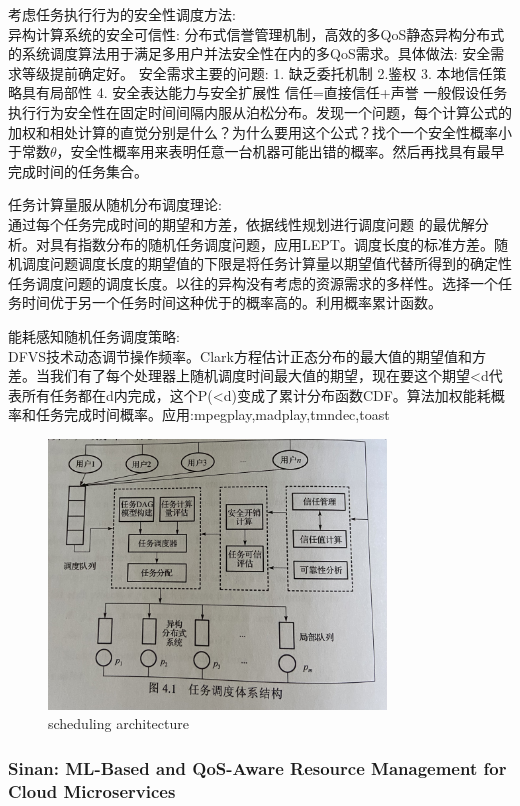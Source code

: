\documentclass[UTF8]{article}
\begin{document}
考虑任务执行行为的安全性调度方法:\\异构计算系统的安全可信性: 分布式信誉管理机制，高效的多QoS静态异构分布式的系统调度算法用于满足多用户并法安全性在内的多QoS需求。具体做法:  安全需求等级提前确定好。 安全需求主要的问题: 1. 缺乏委托机制 2.鉴权 3. 本地信任策略具有局部性 4. 安全表达能力与安全扩展性 信任=直接信任+声誉 一般假设任务执行行为安全性在固定时间间隔内服从泊松分布。发现一个问题，每个计算公式的加权和相处计算的直觉分别是什么？为什么要用这个公式？找个一个安全性概率小于常数$\theta$，安全性概率用来表明任意一台机器可能出错的概率。然后再找具有最早完成时间的任务集合。

任务计算量服从随机分布调度理论:\\ 通过每个任务完成时间的期望和方差，依据线性规划进行调度问题 的最优解分析。对具有指数分布的随机任务调度问题，应用LEPT。调度长度的标准方差。随机调度问题调度长度的期望值的下限是将任务计算量以期望值代替所得到的确定性任务调度问题的调度长度。以往的异构没有考虑的资源需求的多样性。选择一个任务时间优于另一个任务时间这种优于的概率高的。利用概率累计函数。

能耗感知随机任务调度策略:\\DFVS技术动态调节操作频率。Clark方程估计正态分布的最大值的期望值和方差。当我们有了每个处理器上随机调度时间最大值的期望，现在要这个期望<d代表所有任务都在d内完成，这个P(<d)变成了累计分布函数CDF。算法加权能耗概率和任务完成时间概率。应用:mpegplay,madplay,tmndec,toast

\begin{figure}[htbp]
\caption{scheduling architecture}
\centering
\includegraphics[width=0.8\textwidth]{xiaoyongSchedule.jpg}
\end{figure}

\subsubsection{Sinan: ML-Based and QoS-Aware Resource Management for Cloud Microservices}
\end{document}
